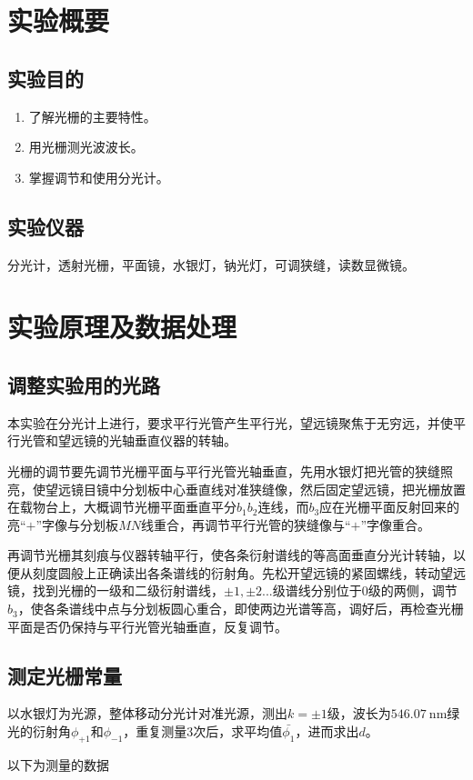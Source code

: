 \documentclass[a4paper]{article}
\begin{document}


\section{实验概要}
%
\subsection{实验目的}
\begin{enumerate}
	\item 了解光栅的主要特性。
	\item 用光栅测光波波长。
	\item 掌握调节和使用分光计。
\end{enumerate}
%
\subsection{实验仪器}
分光计，透射光栅，平面镜，水银灯，钠光灯，可调狭缝，读数显微镜。

\section{实验原理及数据处理}
\subsection{调整实验用的光路}
本实验在分光计上进行，要求平行光管产生平行光，望远镜聚焦于无穷远，并使平行光管和望远镜的光轴垂直仪器的转轴。\par

光栅的调节要先调节光栅平面与平行光管光轴垂直，先用水银灯把光管的狭缝照亮，使望远镜目镜中分划板中心垂直线对准狭缝像，然后固定望远镜，把光栅放置在载物台上，大概调节光栅平面垂直平分$b_1b_2$连线，而$b_3$应在光栅平面反射回来的亮“$+$”字像与分划板$MN$线重合，再调节平行光管的狭缝像与“$+$”字像重合。\par

再调节光栅其刻痕与仪器转轴平行，使各条衍射谱线的等高面垂直分光计转轴，以便从刻度圆般上正确读出各条谱线的衍射角。先松开望远镜的紧固螺线，转动望远镜，找到光栅的一级和二级衍射谱线，$\pm1,\pm2...$级谱线分别位于0级的两侧，调节$b_3$，使各条谱线中点与分划板圆心重合，即使两边光谱等高，调好后，再检查光栅平面是否仍保持与平行光管光轴垂直，反复调节。\par

\clearpage

\subsection{测定光栅常量}
\begin{spacing}{1.6}
	以水银灯为光源，整体移动分光计对准光源，测出$k=\pm1$级，波长为$\SI{546.07}{\nm}$绿光的衍射角$\phi_{+1}$和$\phi_{-1}$，重复测量3次后，求平均值$\bar{\phi_1}$，进而求出$d$。\par
	以下为测量的数据
\end{spacing}
\end{document}
